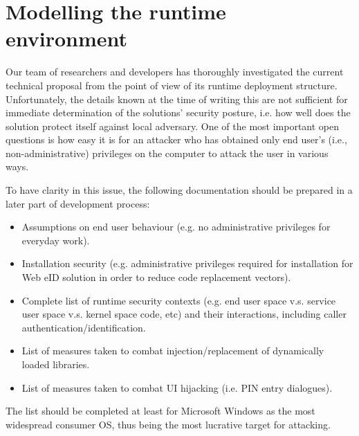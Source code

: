 \section{Modelling the runtime environment}
\label{rec:modeling-runtime-environment}

Our team of researchers and developers has thoroughly investigated the current technical proposal from the point of view of its runtime deployment structure. Unfortunately, the details known at the time of writing this are not sufficient for immediate determination of the solutions' security posture, i.e. how well does the solution protect itself against local adversary. One of the most important open questions is how easy it is for an attacker who has obtained only end user's (i.e., non-administrative) privileges on the computer to attack the user in various ways.

To have clarity in this issue, the following documentation should be prepared in a later part of development process:

\begin{itemize}
    \item Assumptions on end user behaviour (e.g. no administrative privileges for everyday work).
    \item Installation security (e.g. administrative privileges required for installation for Web eID solution in order to reduce code replacement vectors).
    \item Complete list of runtime security contexts (e.g. end user space v.s. service user space v.s. kernel space code, etc) and their interactions, including caller authentication/identification.
    \item List of measures taken to combat injection/replacement of dynamically loaded libraries.
    \item List of measures taken to combat UI hijacking (i.e. PIN entry dialogues).
\end{itemize}

The list should be completed at least for Microsoft Windows as the most widespread consumer OS, thus being the most lucrative target for attacking.